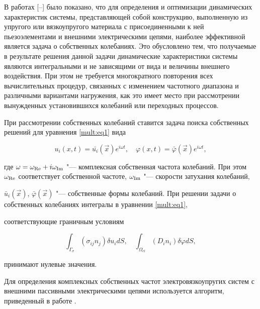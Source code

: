 В работах [--] было показано, что для определения и оптимизации динамических характеристик системы, представляющей собой конструкцию, выполненную из упругого или вязкоупругого материала с присоединенными к ней пьезоэлементами и внешними электрическими цепями, наиболее эффективной является задача о собственных колебаниях. Это обусловлено тем, что получаемые в результате решения данной задачи динамические характеристики системы являются интегральными и не зависящими от вида и величины внешнего воздействия. При этом не требуется многократного повторения всех вычислительных процедур, связанных с изменением частотного диапазона и различными вариантами нагружения, как это имеет место при рассмотрении вынужденных установившихся колебаний или переходных процессов.



При рассмотрении собственных колебаний ставится задача поиска собственных решений для уравнения \eqref{mult:eq1} вида

\begin{equation}\label{mult:eq7}

u_{i} (x,t)=\bar{{u}_{i}}\left(\vec{x}\right)e^{i \omega t}, \quad 

\varphi (x,t )=\bar{\varphi}\left(\vec{x}\right)e^{i \omega t},

\end{equation}

где $\omega=\omega_{\rm Re}+i \omega_{\rm Im}$ "--- комплексная собственная частота колебаний. При этом $\omega_{\rm Re}$ соответствует собственной частоте, $\omega_{\rm Im}$ "--- скорости затухания колебаний,

$\bar{u}_i(\vec{x})$, $\bar{\varphi}(\vec{x})$ "--- собственные формы колебаний. При решении задачи о собственных колебаниях интегралы в уравнении \eqref{mult:eq1},

соответствующие граничным условиям

$$

\int_{\Gamma_{\sigma}}\left(\sigma_{ij}n_{j}\right)\delta u_{i}dS, \quad  \int_{\Omega_{el}}\left(D_{i}n_{i}\right)\delta\varphi dS,

$$

принимают нулевые значения.



Для определения комплексных собственных частот электровязкоупругих систем с внешними пассивными электрическими цепями используется алгоритм, приведенный в работе \cite{mult:Ref23}.



